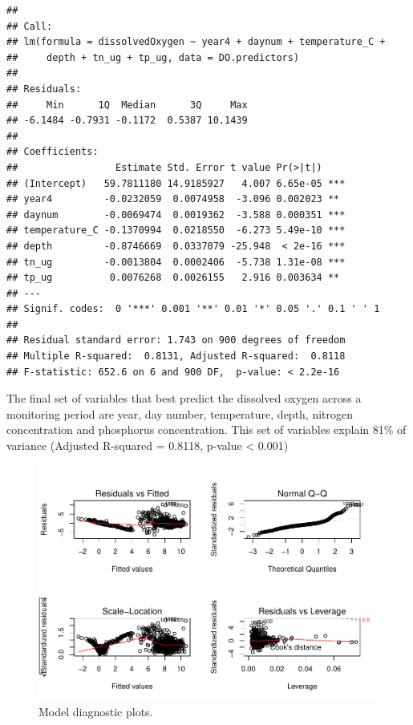 \documentclass[12pt,]{article}
\begin{document}
\begin{verbatim}
## 
## Call:
## lm(formula = dissolvedOxygen ~ year4 + daynum + temperature_C + 
##     depth + tn_ug + tp_ug, data = DO.predictors)
## 
## Residuals:
##     Min      1Q  Median      3Q     Max 
## -6.1484 -0.7931 -0.1172  0.5387 10.1439 
## 
## Coefficients:
##                 Estimate Std. Error t value Pr(>|t|)    
## (Intercept)   59.7811180 14.9185927   4.007 6.65e-05 ***
## year4         -0.0232059  0.0074958  -3.096 0.002023 ** 
## daynum        -0.0069474  0.0019362  -3.588 0.000351 ***
## temperature_C -0.1370994  0.0218550  -6.273 5.49e-10 ***
## depth         -0.8746669  0.0337079 -25.948  < 2e-16 ***
## tn_ug         -0.0013804  0.0002406  -5.738 1.31e-08 ***
## tp_ug          0.0076268  0.0026155   2.916 0.003634 ** 
## ---
## Signif. codes:  0 '***' 0.001 '**' 0.01 '*' 0.05 '.' 0.1 ' ' 1
## 
## Residual standard error: 1.743 on 900 degrees of freedom
## Multiple R-squared:  0.8131, Adjusted R-squared:  0.8118 
## F-statistic: 652.6 on 6 and 900 DF,  p-value: < 2.2e-16
\end{verbatim}

The final set of variables that best predict the dissolved oxygen across
a monitoring period are year, day number, temperature, depth, nitrogen
concentration and phosphorus concentration. This set of variables
explain 81\% of variance (Adjusted R-squared = 0.8118, p-value
\textless{} 0.001)

\begin{figure}
\centering
\includegraphics{Eadala_ENV872_Project_files/figure-latex/fig8-1.pdf}
\caption{Model diagnostic plots.}
\end{figure}
\end{document}
